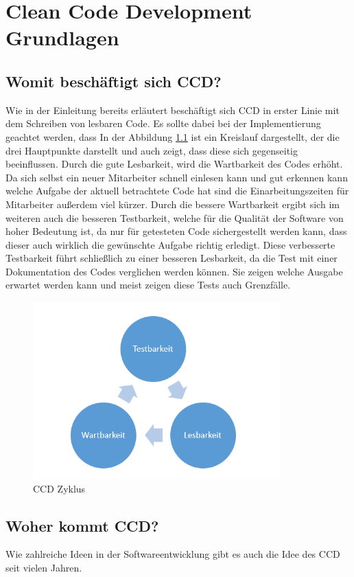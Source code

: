 \chapter{Clean Code Development Grundlagen}
\section{Womit beschäftigt sich CCD?}
\SuperPar Wie in der Einleitung bereits erläutert beschäftigt sich CCD in erster Linie mit dem Schreiben von lesbaren Code. Es sollte dabei bei der Implementierung geachtet werden, dass
In der Abbildung \ref{fig:cycle} ist ein Kreislauf dargestellt, der die drei Hauptpunkte darstellt und auch zeigt, dass diese sich gegenseitig beeinflussen. Durch die gute Lesbarkeit, wird die Wartbarkeit des Codes erhöht. Da sich selbst ein neuer Mitarbeiter schnell einlesen kann und gut erkennen kann welche Aufgabe der aktuell betrachtete Code hat sind die Einarbeitungszeiten für Mitarbeiter außerdem viel kürzer. Durch die bessere Wartbarkeit ergibt sich im weiteren auch die besseren Testbarkeit, welche für die Qualität der Software von hoher Bedeutung ist, da nur für getesteten Code sichergestellt werden kann, dass dieser auch wirklich die gewünschte Aufgabe richtig erledigt. Diese verbesserte Testbarkeit führt schließlich zu einer besseren Lesbarkeit, da die Test mit einer Dokumentation des Codes verglichen werden können. Sie zeigen welche Ausgabe erwartet werden kann und meist zeigen diese Tests auch Grenzfälle.

\begin{figure}[h]
	\centering
		\includegraphics[width=0.85\textwidth]{images/cycle.PNG}
	\caption{CCD Zyklus}
	\label{fig:cycle}
\end{figure}

\section{Woher kommt CCD?}
\SuperPar Wie zahlreiche Ideen in der Softwareentwicklung gibt es auch die Idee des CCD seit vielen Jahren. 

